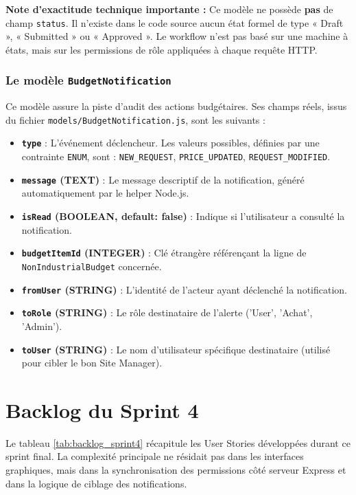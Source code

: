 \textbf{Note d'exactitude technique importante :} Ce modèle ne possède \textbf{pas} de champ \texttt{status}. Il n'existe dans le code source aucun état formel de type « Draft », « Submitted » ou « Approved ». Le workflow n'est pas basé sur une machine à états, mais sur les permissions de rôle appliquées à chaque requête HTTP.

\subsubsection{Le modèle \texttt{BudgetNotification}}
Ce modèle assure la piste d'audit des actions budgétaires. Ses champs réels, issus du fichier \texttt{models/BudgetNotification.js}, sont les suivants :
\begin{itemize}
    \item \textbf{\texttt{type}} : L'événement déclencheur. Les valeurs possibles, définies par une contrainte \texttt{ENUM}, sont : \texttt{NEW\_REQUEST}, \texttt{PRICE\_UPDATED}, \texttt{REQUEST\_MODIFIED}.
    \item \textbf{\texttt{message} (TEXT)} : Le message descriptif de la notification, généré automatiquement par le helper Node.js.
    \item \textbf{\texttt{isRead} (BOOLEAN, default: false)} : Indique si l'utilisateur a consulté la notification.
    \item \textbf{\texttt{budgetItemId} (INTEGER)} : Clé étrangère référençant la ligne de \texttt{NonIndustrialBudget} concernée.
    \item \textbf{\texttt{fromUser} (STRING)} : L'identité de l'acteur ayant déclenché la notification.
    \item \textbf{\texttt{toRole} (STRING)} : Le rôle destinataire de l'alerte ('User', 'Achat', 'Admin').
    \item \textbf{\texttt{toUser} (STRING)} : Le nom d'utilisateur spécifique destinataire (utilisé pour cibler le bon Site Manager).
\end{itemize}

\section{Backlog du Sprint 4}
Le tableau \ref{tab:backlog_sprint4} récapitule les User Stories développées durant ce sprint final. La complexité principale ne résidait pas dans les interfaces graphiques, mais dans la synchronisation des permissions côté serveur Express et dans la logique de ciblage des notifications.

